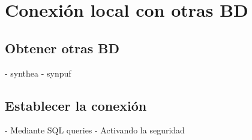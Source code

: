 \chapter{Conexión local con otras BD}

\section{Obtener otras BD}

- synthea
- synpuf


\section{Establecer la conexión}

- Mediante SQL queries
- Activando la seguridad